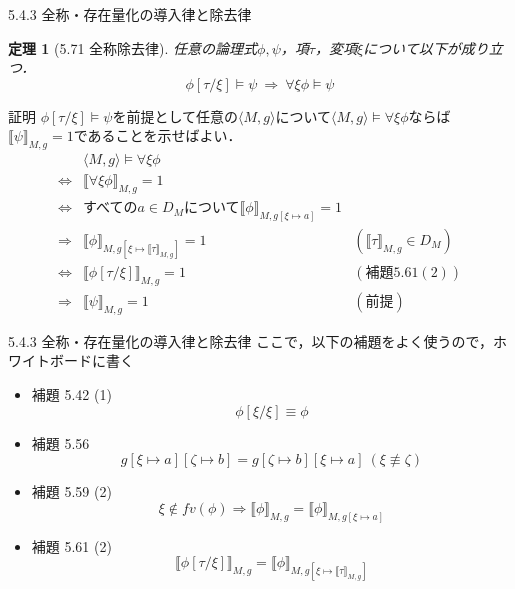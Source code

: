 \documentclass[dvipdfmx,11pt]{beamer}
\newtheorem{theo}[theorem]{定理}
\begin{document}
\begin{frame}{5.4.3 全称・存在量化の導入律と除去律}
  \begin{theo}[5.71 全称除去律]
    任意の論理式\(\phi,\psi\)，項\(\tau\)，変項\(\xi\)について以下が成り立つ．
    \[
    \phi [ \tau / \xi ] \vDash \psi \ \Longrightarrow \ \forall \xi \phi \vDash \psi
    \]
  \end{theo}

  \begin{block}{証明}
    \(\phi [ \tau / \xi ] \vDash \psi\)を前提として任意の\(\langle M,g \rangle\)について\(\langle M,g \rangle \vDash \forall \xi \phi\)ならば\(\llbracket \psi \rrbracket_{M,g}=1\)であることを示せばよい．
    \[
    \begin{array}{rll}
      & \langle M,g \rangle \vDash \forall \xi \phi & \\
      \iff & \llbracket \forall \xi \phi \rrbracket_{M,g} = 1 & \\
      \iff & \textit{すべての}a\in D_{M}\textit{について}\llbracket \phi \rrbracket_{M,g[\xi\mapsto a]} = 1 & \\
      \Longrightarrow & \llbracket \phi \rrbracket_{M,g[\xi \mapsto \llbracket \tau \rrbracket_{M,g}]} = 1 & (\llbracket \tau \rrbracket_{M,g} \in D_{M}) \\
      \iff & \llbracket \phi [ \tau / \xi ] \rrbracket_{M,g} = 1 & (\textit{補題}5.61(2)) \\
      \Longrightarrow & \llbracket \psi \rrbracket_{M,g} = 1 & (\textit{前提})
    \end{array}
    \]
  \end{block}
\end{frame}

\begin{frame}{5.4.3 全称・存在量化の導入律と除去律}
  ここで，以下の補題をよく使うので，ホワイトボードに書く

  \begin{itemize}
  \item 補題 5.42 (1)
    \[
    \phi[\xi/\xi]\equiv\phi
    \]
  \item 補題 5.56
    \[
    g[\xi\mapsto a][\zeta\mapsto b]=g[\zeta\mapsto b][\xi\mapsto a] \ (\xi\not\equiv\zeta)
    \]
  \item 補題 5.59 (2)
    \[
    \xi\not\in\textit{fv}(\phi)\Longrightarrow\llbracket\phi\rrbracket_{M,g}=\llbracket\phi\rrbracket_{M,g[\xi\mapsto a]}
    \]
  \item 補題 5.61 (2)
    \[
    \llbracket\phi[\tau/\xi]\rrbracket_{M,g}=\llbracket\phi\rrbracket_{M,g[\xi\mapsto\llbracket\tau\rrbracket_{M,g}]}
    \]
  \end{itemize}
\end{frame}
\end{document}
